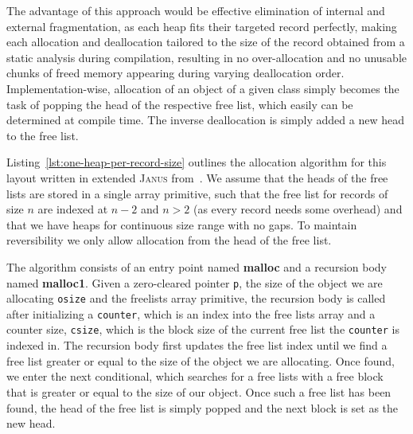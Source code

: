 The advantage of this approach would be effective elimination of internal and external fragmentation, as each heap fits their targeted record perfectly, making each allocation and deallocation tailored to the size of the record obtained from a static analysis during compilation, resulting in no over-allocation and no unusable chunks of freed memory appearing during varying deallocation order. Implementation-wise, allocation of an object of a given class simply becomes the task of popping the head of the respective free list, which easily can be determined at compile time. The inverse deallocation is simply added a new head to the free list.

Listing~\ref{lst:one-heap-per-record-size} outlines the allocation algorithm for this layout written in extended \textsc{Janus} from~\cite{ty:ejanus}. We assume that the heads of the free lists are stored in a single array primitive, such that the free list for records of size $n$ are indexed at $n-2$ and $n > 2$ (as every record needs some overhead) and that we have heaps for continuous size range with no gaps. To maintain reversibility we only allow allocation from the head of the free list.

The algorithm consists of an entry point named \textbf{malloc} and a recursion body named \textbf{malloc1}. Given a zero-cleared pointer \texttt{p}, the size of the object we are allocating \texttt{osize} and the freelists array primitive, the recursion body is called after initializing a \texttt{counter}, which is an index into the free lists array and a counter size, \texttt{csize}, which is the block size of the current free list the \texttt{counter} is indexed in. The recursion body first updates the free list index until we find a free list greater or equal to the size of the object we are allocating. Once found, we enter the next conditional, which searches for a free lists with a free block that is greater or equal to the size of our object. Once such a free list has been found, the head of the free list is simply popped and the next block is set as the new head.\\

